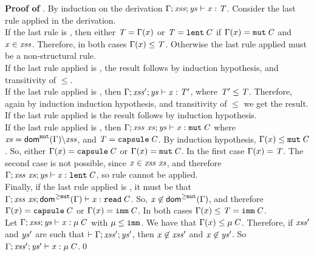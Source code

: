 \medskip
\noindent
{\bf Proof of }. 
By induction on the derivation $\Gamma;\mathit{xss};\mathit{ys}\vdash {\mathit{x}}:\mathit{T}$.
Consider the last rule applied in the derivation.\\
If the last rule is , then either $\mathit{T}=\Gamma(x)$ or $\mathit{T}=\texttt{lent}\,\mathit{C}$ if $\Gamma(x)=\texttt{mut}\,\mathit{C}$ and $\mathit{x}\in\mathit{xss}$. 
Therefore, in both cases $\Gamma(x)\leq\mathit{T}$.
Otherwise the last rule applied must be a non-structural rule.\\
If the last rule applied is , the result follows by induction hypothesis, and
transitivity of $\leq$.\\
If the last rule applied is , then $\Gamma;\mathit{xss}';\mathit{ys}\vdash {\mathit{x}}:\mathit{T}'$, where 
$\mathit{T}'\leq\mathit{T}$. Therefore, again by induction induction hypothesis, and
transitivity of $\leq$ we get the result.\\
If the last rule applied is  the result follows by induction hypothesis.\\
If the last rule applied is , then
$\TypeCheck{\Gamma}{\LentLocked\ \xs}{\StronglyLocked}{{\x}}{\Type{\mutable}{\C}}$
where $\mathit{xs}=\textsf{dom}^{\texttt{mut}}(\Gamma){\setminus}\mathit{xss}$, and $\mathit{T}=\texttt{capsule}\,\mathit{C}$.
By induction hypothesis, $\Gamma(x)\leq\texttt{mut}\,\mathit{C}$. So, either 
$\Gamma(x)=\texttt{capsule}\,\mathit{C}$ or $\Gamma(x)=\texttt{mut}\,\mathit{C}$. In the first case
$\Gamma(x)=\mathit{T}$. The second case is not possible, since $\mathit{x}\in\mathit{xss}\ \mathit{xs}$, and therefore 
$\TypeCheck{\Gamma}{\LentLocked\ \xs}{\StronglyLocked}{{\x}}{\Type{\lent}{\C}}$,
so rule  cannot be applied. \\
Finally, if the last rule applied is , it must be that
$\TypeCheck{\Gamma}{\LentLocked\ \xs}{\domGeqMut(\Gamma) }{\x}{\Type{{\readable}}{\C}}$.
So, $\mathit{x}\not\in{\textsf{dom}^{\geq\texttt{mut}}}(\Gamma)$, and therefore $\Gamma(x)=\texttt{capsule}\,\mathit{C}$ or 
$\Gamma(x)=\texttt{imm}\,\mathit{C}$. In both cases $\Gamma(x)\leq\mathit{T}=\texttt{imm}\,\mathit{C}$.\\
Let $\Gamma;\mathit{xss};\mathit{ys}\vdash {\mathit{x}}:\mu\,\mathit{C}$ with
$\mu\leq\texttt{imm}$. We have that $\Gamma(x)\leq\mu\,\mathit{C}$. Therefore, if
$\mathit{xss}'$ and $\mathit{ys}'$ are such that  $\vdash\Gamma;{\mathit{xss}'};\mathit{ys}'$,
then $\mathit{x}\not\in\mathit{xss}'$ and $\mathit{x}\not\in\mathit{ys}'$. So 
$\Gamma;\mathit{xss}';\mathit{ys}'\vdash {\mathit{x}}:\mu\,\mathit{C}$.\qed

